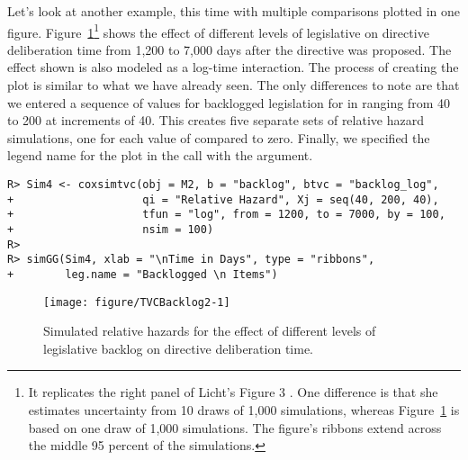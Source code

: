 \documentclass[nojss]{jss}\usepackage[]{graphicx}\usepackage[]{color}
\makeatletter
\newenvironment{kframe}{%
 \def\at@end@of@kframe{}%
 \ifinner\ifhmode%
  \def\at@end@of@kframe{\end{minipage}}%
  \begin{minipage}{\columnwidth}%
 \fi\fi%
 \def\FrameCommand##1{\hskip\@totalleftmargin \hskip-\fboxsep
 \colorbox{shadecolor}{##1}\hskip-\fboxsep
     \hskip-\linewidth \hskip-\@totalleftmargin \hskip\columnwidth}%
 \MakeFramed {\advance\hsize-\width
   \@totalleftmargin\z@ \linewidth\hsize
   \@setminipage}}%
 {\par\unskip\endMakeFramed%
 \at@end@of@kframe}
\newenvironment{knitrout}{}{} %
\makeatother
\begin{document}
Let's look at another example, this time with multiple comparisons plotted in one figure. Figure~\ref{BacklogRH}\footnote{It replicates the right panel of Licht's \citeyearpar{Licht2011} Figure 3 \citeyearpar[][237]{Licht2011}. One difference is that she estimates uncertainty from 10 draws of 1,000 simulations, whereas Figure~\ref{BacklogRH} is based on one draw of 1,000 simulations. The figure's ribbons extend across the middle 95 percent of the simulations.} shows the effect of different levels of legislative  on directive deliberation time from 1,200 to 7,000 days after the directive was proposed. The effect shown is also modeled as a log-time interaction. The process of creating the plot is similar to what we have already seen. The only differences to note are that we entered a sequence of values for backlogged legislation for  in  ranging from 40 to 200 at increments of 40. This creates five separate sets of relative hazard simulations, one for each value of  compared to zero. Finally, we specified the legend name for the plot in the  call with the  argument.

\begin{knitrout}
\color{fgcolor}\begin{kframe}
\begin{verbatim}
R> Sim4 <- coxsimtvc(obj = M2, b = "backlog", btvc = "backlog_log",
+                    qi = "Relative Hazard", Xj = seq(40, 200, 40),
+                    tfun = "log", from = 1200, to = 7000, by = 100,
+                    nsim = 100)
R> 
R> simGG(Sim4, xlab = "\nTime in Days", type = "ribbons",
+        leg.name = "Backlogged \n Items")
\end{verbatim}
\end{kframe}
\end{knitrout}

\begin{figure}

\begin{knitrout}
\color{fgcolor}

{\centering \texttt{[image: figure/TVCBacklog2-1]} 

}



\end{knitrout}
  \caption{Simulated relative hazards for the effect of different levels of legislative backlog on directive deliberation time.}
  \label{BacklogRH}
\end{figure}
\end{document}
